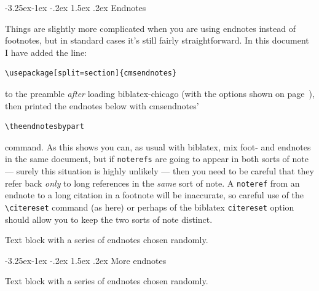 \documentclass[a4paper,12pt]{article}
\makeatletter
\renewcommand{\section}{\@startsection{section}{1}{\z@}%
                                     {-3.25ex\@plus -1ex \@minus -.2ex}%
                                     {1.5ex \@plus .2ex}%
                                     {\normalfont\large\bfseries}}
\newcommand{\cmd}[1]{\texttt{\textbackslash #1}}
\newcommand{\mylittlespace}{\vspace{5pt}}%
\makeatother
\begin{document}
\section{Endnotes}
\label{cms:endnotes}\citereset

Things are 
slightly more complicated when you are using endnotes instead of
footnotes, but in standard cases it's still fairly straightforward.
In this document I have added the line:
\begin{verbatim}
\usepackage[split=section]{cmsendnotes}
\end{verbatim}
to the preamble \emph{after} loading \textsf{biblatex-chicago} (with
the options shown on page~\pageref{cms:top}), then printed the
endnotes below with \textsf{cmsendnotes'}
\begin{verbatim}
\theendnotesbypart
\end{verbatim}
command.  As this shows you can, as usual with \textsf{biblatex}, mix
foot- and endnotes in the same document, but if \texttt{noterefs} are
going to appear in both sorts of note --- surely this situation is
highly unlikely --- then you need to be careful that they refer back
\emph{only} to long references in the \emph{same} sort of note.  A
\texttt{noteref} from an endnote to a long citation in a footnote will
be inaccurate, so careful use of the \cmd{citereset} command (as here)
or perhaps of the \textsf{biblatex} \texttt{citereset} option should
allow you to keep the two sorts of note distinct.

\mylittlespace Text
block
with
a
series
of
endnotes
chosen
randomly.

\section{More endnotes}
\label{sec:moreen}

Text
block
with
a
series
of
endnotes
chosen
randomly.
\end{document}
